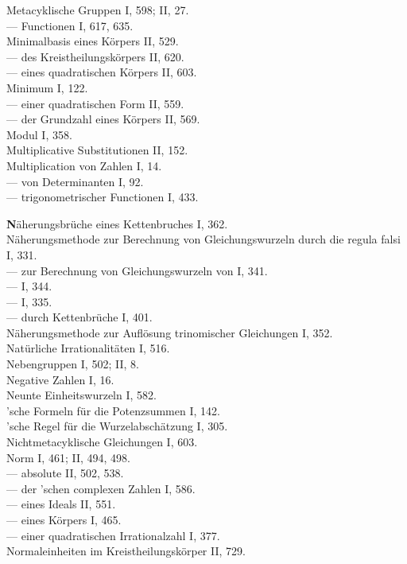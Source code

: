 Metacyklische Gruppen I, 598; II, 27.\\
--- Functionen I, 617, 635.\\
Minimalbasis eines Körpers II, 529.\\
--- des Kreistheilungskörpers II, 620.\\
--- eines quadratischen Körpers II, 603.\\
Minimum I, 122.\\
--- einer quadratischen Form II, 559.\\
--- der Grundzahl eines Körpers II, 569.\\
Modul I, 358.\\
Multiplicative Substitutionen II, 152.\\
Multiplication von Zahlen I, 14.\\
--- von Determinanten I, 92.\\
--- trigonometrischer Functionen I, 433.

\medskip
\noindent
\textbf{N}äherungsbrüche eines Kettenbruches I, 362.\\
Näherungsmethode zur Berechnung von Gleichungswurzeln durch die regula falsi I, 331.\\
--- zur Berechnung von Gleichungswurzeln von  I, 341.\\ %
---  I, 344.\\
---  I, 335.\\
--- durch Kettenbrüche I, 401.\\
Näherungsmethode zur Auflösung trinomischer Gleichungen I, 352.\\
Natürliche Irrationalitäten I, 516.\\
Nebengruppen I, 502; II, 8.\\
Negative Zahlen I, 16.\\
Neunte Einheitswurzeln I, 582.\\
'sche Formeln für die Potenzsummen I, 142.\\
'sche Regel für die Wurzelabschätzung I, 305.\\
Nichtmetacyklische Gleichungen I, 603.\\
Norm I, 461; II, 494, 498.\\
--- absolute II, 502, 538.\\
--- der 'schen complexen Zahlen I, 586.\\
--- eines Ideals II, 551.\\
--- eines Körpers I, 465.\\
--- einer quadratischen Irrationalzahl I, 377.\\
Normaleinheiten im Kreistheilungskörper II, 729.

